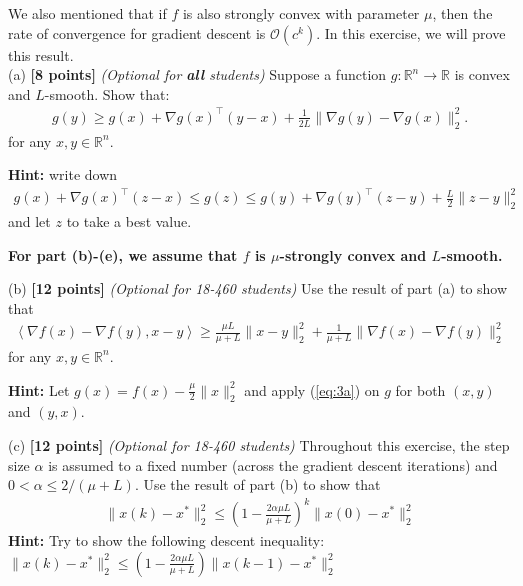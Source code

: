 \documentclass{article}
\begin{document}
We also mentioned that if $f$ is
also strongly convex with parameter $\mu$, 
then the rate of convergence for gradient descent is $\mathcal{O}(c^k)$.
In this exercise, we will prove this result.\\

\noindent
(a) \textbf{[8 points]} \emph{(Optional for \textbf{all} students)} Suppose a function $g:\mathbb{R}^n\rightarrow \mathbb{R}$ is convex and $L$-smooth. Show that:
\begin{align}
\label{eq:3a}
g(y) \ge g(x) + \nabla g(x)^\top (y-x) + \frac{1}{2L}\|\nabla g(y) - \nabla g(x)\|_2^2.
\end{align}
for any $x, y \in \mathbb{R}^n$.

\noindent
\textbf{Hint:} write down
\begin{align*}
g(x) + \nabla g(x)^\top(z-x) \le g(z) \le g(y) + \nabla g(y)^\top(z-y) + \frac{L}{2}\|z-y\|_2^2
\end{align*}
and let $z$ to take a best value.
\begin{tcolorbox}
	\end{tcolorbox}

\noindent\textbf{For part (b)-(e), we assume that $f$ is $\mu$-strongly convex and $L$-smooth. }

\noindent (b) \textbf{[12 points]} \emph{(Optional for 18-460 students)} Use the result of part (a) to show that
\begin{align}
	\left\langle \nabla f(x) - \nabla f(y), x - y \right\rangle \ge
    \frac{\mu L}{\mu+L} \|x - y\|^2_2 + \frac{1}{\mu+L} \|\nabla f(x) - \nabla f(y)\|^2_2
\end{align}
for any $x,y \in \mathbb{R}^n$.

\noindent
\textbf{Hint:} Let $g(x) = f(x) - \frac{\mu}{2}\|x\|_2^2$ and apply (\ref{eq:3a}) on $g$ for both $(x,y)$ and $(y,x)$. 
\begin{tcolorbox}
	\end{tcolorbox}

\noindent
(c) \textbf{[12 points]} \emph{(Optional for 18-460 students)} Throughout this exercise, the step size $\alpha$ is assumed to a fixed
number (across the gradient descent iterations) and $0 < \alpha \le 2/(\mu+L)$. Use the result of part (b) to show that
\begin{align}
	\|x(k) - x^*\|^2_2 \le \left(1 - \frac{2\alpha \mu L}{\mu+L} \right)^k \|x(0) - x^*\|^2_2
\end{align}
\textbf{Hint:} Try to show the following descent inequality: $	\|x(k) - x^*\|^2_2 \le \left(1 - \frac{2\alpha \mu L}{\mu+L} \right) \|x(k-1) - x^*\|^2_2$
\begin{tcolorbox}
	\end{tcolorbox}
\end{document}
